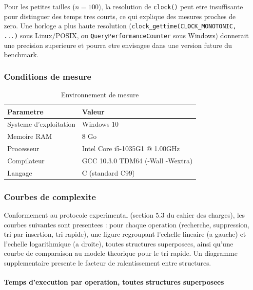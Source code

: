 \documentclass[12pt,a4paper]{article}
\begin{document}
\begin{remarque}
Pour les petites tailles ($n=100$), la resolution de \texttt{clock()}
peut etre insuffisante pour distinguer des temps tres courts, ce qui
explique des mesures proches de zero. Une horloge a plus haute
resolution (\texttt{clock\_gettime(CLOCK\_MONOTONIC, ...)} sous
Linux/POSIX, ou \texttt{QueryPerformanceCounter} sous Windows)
donnerait une precision superieure et pourra etre envisagee dans
une version future du benchmark.
\end{remarque}

\subsubsection{Conditions de mesure}

\begin{table}[H]
\centering
\caption{Environnement de mesure}
\begin{tabular}{ll}
\toprule
\textbf{Parametre} & \textbf{Valeur} \\
\midrule
Systeme d'exploitation & Windows 10 \\
Memoire RAM            & 8 Go \\
Processeur            & Intel Core i5-1035G1 @ 1.00GHz \\
Compilateur            & GCC 10.3.0 TDM64 (-Wall -Wextra) \\
Langage                & C (standard C99) \\
\bottomrule
\end{tabular}
\end{table}

\subsubsection{Courbes de complexite}

Conformement au protocole experimental (section 5.3 du cahier des
charges), les courbes suivantes sont presentees : pour chaque
operation (recherche, suppression, tri par insertion, tri rapide),
une figure regroupant l'echelle lineaire (a gauche) et l'echelle
logarithmique (a droite), toutes structures superposees, ainsi
qu'une courbe de comparaison au modele theorique pour le tri
rapide. Un diagramme supplementaire presente le facteur de
ralentissement entre structures.

\paragraph{Temps d'execution par operation, toutes structures superposees}
\end{document}
